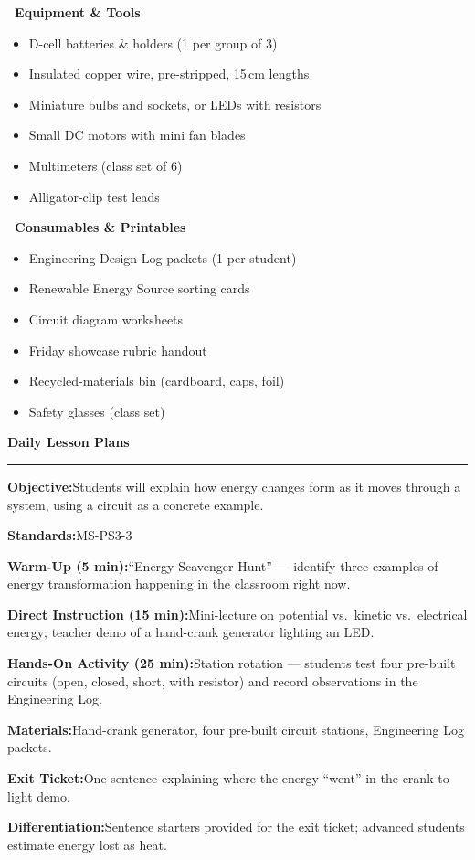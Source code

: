 \documentclass[11pt,a4paper,parskip=half]{scrartcl}
\newcommand{\plansection}[2]{%
  \vspace{12pt}%
  {\color{stemteal}\Large\bfseries #1\ \textcolor{stemamber}{\normalsize\faIcon{#2}}}\par
  {\color{stemamber}\rule{\linewidth}{1.1pt}}\par
  \vspace{4pt}%
}
\newcommand{\dayline}[2]{%
  \noindent\small\textcolor{stemteal}{\textbf{#1}}\quad\small #2\par\smallskip
}
\newcommand{\ckbox}{\textcolor{stemteal}{$\square$}}
\begin{document}
\noindent
\begin{minipage}[t]{0.48\textwidth}
\textbf{\color{stemslate}\ Equipment \& Tools}
\begin{itemize}[label=\ckbox,leftmargin=16pt,itemsep=3pt,topsep=4pt]
  \small
  \item D-cell batteries \& holders (1 per group of 3)
  \item Insulated copper wire, pre-stripped, 15\,cm lengths
  \item Miniature bulbs and sockets, or LEDs with resistors
  \item Small DC motors with mini fan blades
  \item Multimeters (class set of 6)
  \item Alligator-clip test leads
\end{itemize}
\end{minipage}%
\hfill
\begin{minipage}[t]{0.48\textwidth}
\textbf{\color{stemslate}\ Consumables \& Printables}
\begin{itemize}[label=\ckbox,leftmargin=16pt,itemsep=3pt,topsep=4pt]
  \small
  \item Engineering Design Log packets (1 per student)
  \item Renewable Energy Source sorting cards
  \item Circuit diagram worksheets
  \item Friday showcase rubric handout
  \item Recycled-materials bin (cardboard, caps, foil)
  \item Safety glasses (class set)
\end{itemize}
\end{minipage}
\par

\plansection{Daily Lesson Plans}{calendar}

\begin{tcolorbox}[daybox,title={Monday --- Energy Forms \& Transfer (Intro)}]
\dayline{Objective:}{Students will explain how energy changes form as it moves through a system, using a circuit as a concrete example.}
\dayline{Standards:}{MS-PS3-3}
\dayline{Warm-Up (5 min):}{``Energy Scavenger Hunt'' --- identify three examples of energy transformation happening in the classroom right now.}
\dayline{Direct Instruction (15 min):}{Mini-lecture on potential vs.\ kinetic vs.\ electrical energy; teacher demo of a hand-crank generator lighting an LED.}
\dayline{Hands-On Activity (25 min):}{Station rotation --- students test four pre-built circuits (open, closed, short, with resistor) and record observations in the Engineering Log.}
\dayline{Materials:}{Hand-crank generator, four pre-built circuit stations, Engineering Log packets.}
\dayline{Exit Ticket:}{One sentence explaining where the energy ``went'' in the crank-to-light demo.}
\dayline{Differentiation:}{Sentence starters provided for the exit ticket; advanced students estimate energy lost as heat.}
\end{tcolorbox}
\end{document}
